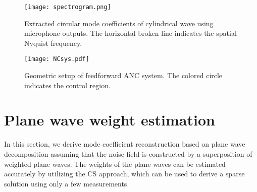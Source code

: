 \documentclass{article}
\begin{document}
%
\begin{figure}[t]
\vspace*{-5pt}
  \centering
  \centerline{\texttt{[image: spectrogram.png]}}
\vspace{-1pt}
\caption{Extracted circular mode coefficients of cylindrical wave using microphone outputs. The horizontal broken line indicates the spatial Nyquist frequency.}
\label{fig:spectrogram}
\vspace{-4pt}
\end{figure}
%

%
\begin{figure}[t]
\vspace*{-5pt}
  \centering
  \centerline{\texttt{[image: NCsys.pdf]}}
\vspace{-1pt}
\caption{Geometric setup of feedforward ANC system. The colored circle indicates the control region.}
\label{fig:NCsys}
\vspace{-4pt}
\end{figure}
%

%
\section{Plane wave weight estimation}
\label{sec:estimation}
%
In this section, we derive mode coefficient reconstruction based on plane wave decomposition
assuming that the noise field is constructed by a superposition of weighted plane waves.
The weights of the plane waves can be estimated accurately by utilizing
the CS approach, which can be used 
to derive a sparse solution using only a few measurements.
\end{document}
